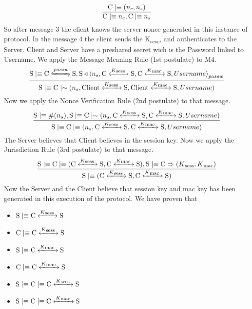 \[ \frac{\textnormal{C} \mid\equiv (n_c,n_s)}{\textnormal{C} \mid\equiv n_c, \textnormal{C} \mid\equiv n_s}\]
So after message 3 the client knows the server nonce generated in this instance of protocol. In the message 4 the client sends the K\textsubscript{sess}, and authenticates to the Server. Client and Server have a preshared secret wich is the Password linked to Username. We apply the Message Meaning Rule (1st postulate) to M4.
\[ \frac{\textnormal{S} \believes \textnormal{C} \secret{passw} \textnormal{S}, \textnormal{S} \sees \combine{n_s,\textnormal{C} \sharekey{K\textsubscript{sess }} \textnormal{S},\textnormal{C} \sharekey{K\textsubscript{mac }} \textnormal{S},Username}{passw}}{\textnormal{S}\believes \textnormal{C} \oncesaid (n_s,\textnormal{Client} \sharekey{K\textsubscript{sess }} \textnormal{S},\textnormal{Client} \sharekey{K\textsubscript{mac }} \textnormal{S},Username)} \]
Now we apply the Nonce Verification Rule (2nd postulate) to that message.
\[ \frac{\textnormal{S}\mid\equiv \#(n_s), \textnormal{S} \mid\equiv \textnormal{C} \mid\sim (n_s,\textnormal{C} \xleftrightarrow{K\textsubscript{sess }} \textnormal{S},\textnormal{C} \xleftrightarrow{K\textsubscript{mac }} \textnormal{S},Username)}
   {\textnormal{S} \mid\equiv \textnormal{C} \mid\equiv (n_s,\textnormal{C} \xleftrightarrow{K\textsubscript{sess }} \textnormal{S},\textnormal{C} \xleftrightarrow{K\textsubscript{mac }} \textnormal{S},Username)}	\]
The Server believes that Client believes in the session key. Now we apply the Jurisdiction Rule (3rd postulate) to that message.
\[ \frac{\textnormal{S} \mid\equiv \textnormal{C} \mid\equiv (\textnormal{C} \xleftrightarrow{K\textsubscript{sess }} \textnormal{S},\textnormal{C} \xleftrightarrow{K\textsubscript{mac }} \textnormal{S}), \textnormal{S} \mid\equiv \textnormal{C} \Rightarrow (K\textsubscript{sess},K\textsubscript{mac})}
        {\textnormal{S} \mid\equiv (\textnormal{C} \xleftrightarrow{K\textsubscript{sess }} \textnormal{S},\textnormal{C} \xleftrightarrow{K\textsubscript{mac }} \textnormal{S}) } \]
Now the Server and the Client believe that session key and mac key has been generated in this execution of the protocol. We have proven that
\begin{itemize}
	\item \(\textnormal{S} \mid\equiv \textnormal{C} \xleftrightarrow{K\textsubscript{sess }} \textnormal{S}\)
	\item \(\textnormal{C} \mid\equiv \textnormal{C} \xleftrightarrow{K\textsubscript{sess }} \textnormal{S}\)
	\item \(\textnormal{S} \mid\equiv \textnormal{C} \xleftrightarrow{K\textsubscript{mac }} \textnormal{S}\)
	\item \(\textnormal{C} \mid\equiv \textnormal{C} \xleftrightarrow{K\textsubscript{mac }} \textnormal{S}\) 
	\item \(\textnormal{S} \mid\equiv \textnormal{C} \mid\equiv \textnormal{C} \xleftrightarrow{K\textsubscript{sess }} \textnormal{S}\)
	\item \(\textnormal{S} \mid\equiv \textnormal{C} \mid\equiv \textnormal{C} \xleftrightarrow{K\textsubscript{mac }} \textnormal{S}\)
\end{itemize}
